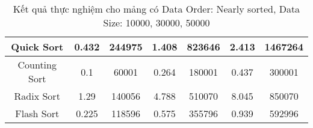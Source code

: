 \begin{table}[H]
{\begin{tabular}{|ccccccc|}
\multicolumn{1}{|c|}{Quick Sort} & \multicolumn{1}{c|}{0.432} & \multicolumn{1}{c|}{244975} & \multicolumn{1}{c|}{1.408} & \multicolumn{1}{c|}{823646} & \multicolumn{1}{c|}{2.413} & \multicolumn{1}{c|}{1467264} \\ \hline
\multicolumn{1}{|c|}{Counting Sort} & \multicolumn{1}{c|}{0.1} & \multicolumn{1}{c|}{60001} & \multicolumn{1}{c|}{0.264} & \multicolumn{1}{c|}{180001} & \multicolumn{1}{c|}{0.437} & \multicolumn{1}{c|}{300001} \\ \hline
\multicolumn{1}{|c|}{Radix Sort} & \multicolumn{1}{c|}{1.29} & \multicolumn{1}{c|}{140056} & \multicolumn{1}{c|}{4.788} & \multicolumn{1}{c|}{510070} & \multicolumn{1}{c|}{8.045} & \multicolumn{1}{c|}{850070} \\ \hline
\multicolumn{1}{|c|}{Flash Sort} & \multicolumn{1}{c|}{0.225} & \multicolumn{1}{c|}{118596} & \multicolumn{1}{c|}{0.575} & \multicolumn{1}{c|}{355796} & \multicolumn{1}{c|}{0.939} & \multicolumn{1}{c|}{592996} \\ \hline
\end{tabular}%
}
\caption{Kết quả thực nghiệm cho mảng có Data Order: Nearly sorted, Data Size: 10000, 30000, 50000}
\label{tab:nearly_sorted_10000_30000_50000}
\end{table}

